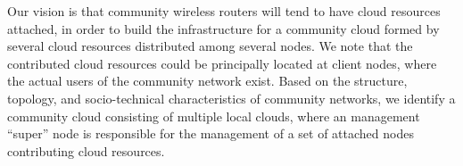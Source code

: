 Our vision is that community wireless routers will tend to have cloud resources attached, in order to build the infrastructure for a community cloud formed by several cloud resources distributed among several nodes. 
We note that the contributed cloud resources could be principally located at client nodes, where the actual users of the community network exist. 
Based on the structure, topology, and socio-technical characteristics of community networks, we identify a community cloud consisting of multiple local clouds, where an management \enquote{super} node is responsible for the management of a set of attached nodes contributing cloud resources. 
%
%
%
%
%
